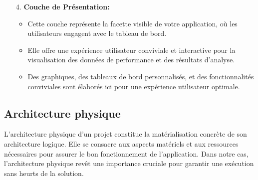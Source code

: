 \begin{enumerate}
        \item[4.] \textbf{Couche de Présentation:}
            \begin{itemize}
                \item Cette couche représente la facette visible de votre application, où les utilisateurs engagent avec le tableau de bord.
                \item Elle offre une expérience utilisateur conviviale et interactive pour la visualisation des données de performance et des résultats d'analyse.
                \item Des graphiques, des tableaux de bord personnalisés, et des fonctionnalités conviviales sont élaborés ici pour une expérience utilisateur optimale.
            \end{itemize}
    \end{enumerate}
    \subsection{Architecture physique}
    \par L'architecture physique d'un projet constitue la matérialisation concrète de son architecture logique. Elle se consacre aux aspects matériels et aux ressources nécessaires pour assurer le bon fonctionnement de l'application\cite{archi_phy}. Dans notre cas, l'architecture physique revêt une importance cruciale pour garantir une exécution sans heurts de la solution.

